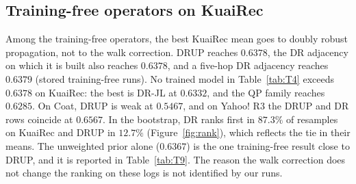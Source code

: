 



\subsection{Training-free operators on KuaiRec}

Among the training-free operators, the best KuaiRec mean goes to doubly robust propagation, not to the walk correction.
DRUP reaches $0.6378$, the DR adjacency on which it is built also reaches $0.6378$, and a five-hop DR adjacency reaches
$0.6379$ (stored training-free runs). No trained model in Table~\ref{tab:T4} exceeds $0.6378$ on KuaiRec: the best is
DR-JL at $0.6332$, and the QP family reaches $0.6285$. On Coat, DRUP is weak at $0.5467$, and on Yahoo! R3 the DRUP and
DR rows coincide at $0.6567$. In the bootstrap, DR ranks first in $87.3\%$ of resamples on KuaiRec and DRUP in $12.7\%$
(Figure~\ref{fig:rank}), which reflects the tie in their means. The unweighted prior alone ($0.6367$) is the one
training-free result close to DRUP, and it is reported in Table~\ref{tab:T9}. The reason the walk correction does not
change the ranking on these logs is not identified by our runs.
